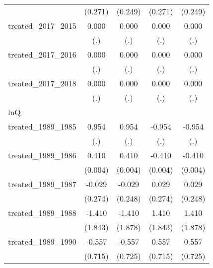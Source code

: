 {\begin{tabular}{l*{4}{c}}
            &     (0.271)         &     (0.249)         &     (0.271)         &     (0.249)         \\
[1em]
treated\_2017\_2015&       0.000         &       0.000         &       0.000         &       0.000         \\
            &         (.)         &         (.)         &         (.)         &         (.)         \\
[1em]
treated\_2017\_2016&       0.000         &       0.000         &       0.000         &       0.000         \\
            &         (.)         &         (.)         &         (.)         &         (.)         \\
[1em]
treated\_2017\_2018&       0.000         &       0.000         &       0.000         &       0.000         \\
            &         (.)         &         (.)         &         (.)         &         (.)         \\
\hline
lnQ         &                     &                     &                     &                     \\
treated\_1989\_1985&       0.954         &       0.954         &      -0.954         &      -0.954         \\
            &         (.)         &         (.)         &         (.)         &         (.)         \\
[1em]
treated\_1989\_1986&       0.410\sym{***}&       0.410\sym{***}&      -0.410\sym{***}&      -0.410\sym{***}\\
            &     (0.004)         &     (0.004)         &     (0.004)         &     (0.004)         \\
[1em]
treated\_1989\_1987&      -0.029         &      -0.029         &       0.029         &       0.029         \\
            &     (0.274)         &     (0.248)         &     (0.274)         &     (0.248)         \\
[1em]
treated\_1989\_1988&      -1.410         &      -1.410         &       1.410         &       1.410         \\
            &     (1.843)         &     (1.878)         &     (1.843)         &     (1.878)         \\
[1em]
treated\_1989\_1990&      -0.557         &      -0.557         &       0.557         &       0.557         \\
            &     (0.715)         &     (0.725)         &     (0.715)         &     (0.725)         \\

\end{tabular}}
